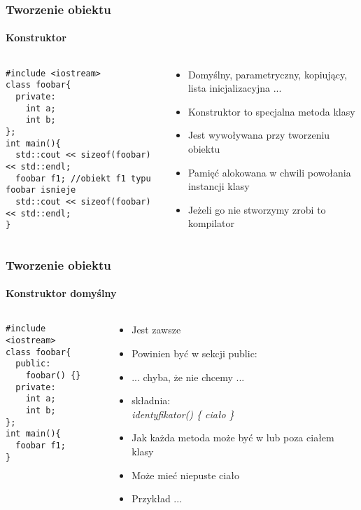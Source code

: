 \documentclass[10pt]{beamer}
\begin{document}
\begin{frame}[fragile]
  \frametitle{Tworzenie obiektu}
  \framesubtitle{Konstruktor}
  \begin{columns}
    \begin{column}{0.48\textwidth}
\begin{lstlisting}
#include <iostream>
class foobar{
  private:
    int a;
    int b;
};
int main(){
  std::cout << sizeof(foobar) << std::endl;
  foobar f1; //obiekt f1 typu foobar isnieje
  std::cout << sizeof(foobar) << std::endl;
}
\end{lstlisting}
    \end{column}
    \begin{column}{0.48\textwidth}
      \begin{itemize}
        \item Domyślny, parametryczny, kopiujący, lista inicjalizacyjna ...
        \item Konstruktor to specjalna metoda klasy
        \item Jest wywoływana przy tworzeniu obiektu
        \item Pamięć alokowana w chwili powołania instancji klasy
        \item Jeżeli go nie stworzymy zrobi to kompilator
      \end{itemize}
    \end{column}
  \end{columns}
\end{frame}

\begin{frame}[fragile]
  \frametitle{Tworzenie obiektu}
  \framesubtitle{Konstruktor domyślny}
  \begin{columns}
    \begin{column}{0.48\textwidth}
\begin{lstlisting}
#include <iostream>
class foobar{
  public:
    foobar() {}
  private:
    int a;
    int b;
};
int main(){
  foobar f1;
}
\end{lstlisting}
    \end{column}
    \begin{column}{0.48\textwidth}
      \begin{itemize}
        \item Jest zawsze
        \item Powinien być w sekcji public:
        \item ... chyba, że nie chcemy ...
        \item składnia:\\ \textit{identyfikator() \{ ciało \}}
        \item Jak każda metoda może być w lub poza ciałem klasy
        \item Może mieć niepuste ciało
        \item Przykład ...
      \end{itemize}
    \end{column}
  \end{columns}
\end{frame}
\end{document}
